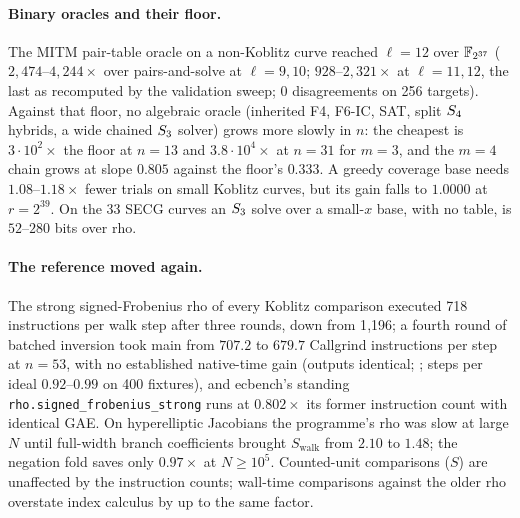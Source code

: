 \paragraph{Binary oracles and their floor.} The MITM pair-table oracle on a
non-Koblitz curve reached $\ell=12$ over $\mathbb{F}_{2^{37}}$
($2{,}474$--$4{,}244\times$ over pairs-and-solve at $\ell=9,10$;
$928$--$2{,}321\times$ at $\ell=11,12$, the last as recomputed by the
validation sweep; 0 disagreements on 256 targets).
Against that floor, no algebraic oracle (inherited F4, F6-IC, SAT, split
$S_{4}$ hybrids, a wide chained $S_{3}$ solver) grows more slowly in $n$:
the cheapest is $3\cdot10^2\times$ the floor at $n=13$ and $3.8\cdot10^4\times$
at $n=31$ for $m=3$, and the $m=4$ chain grows at slope $0.805$ against the
floor's $0.333$. A greedy coverage base needs $1.08$--$1.18\times$ fewer
trials on small Koblitz curves, but its gain falls to $1.0000$ at
$r=2^{39}$. On the 33 SECG curves an $S_{3}$ solve over a small-$x$ base,
with no table, is $52$--$280$ bits over rho.

\paragraph{The reference moved again.} The strong signed-Frobenius rho of
every Koblitz comparison executed 718 instructions per walk step after
three rounds, down from 1{,}196; a fourth round of batched inversion took
main from $707.2$ to $679.7$ Callgrind instructions per step at $n=53$, with
no established native-time gain (outputs identical;
; steps per ideal
$0.92$--$0.99$ on 400 fixtures), and ecbench's standing
\texttt{rho.signed\_frobenius\_strong} runs at $0.802\times$ its former
instruction count with identical GAE. On hyperelliptic Jacobians the
programme's rho was slow at large $N$ until full-width branch coefficients
brought $S_\text{walk}$ from $2.10$ to $1.48$; the negation fold saves only
$0.97\times$ at $N\ge10^5$. Counted-unit comparisons ($S$) are unaffected
by the instruction counts; wall-time comparisons against the older rho
overstate index calculus by up to the same factor.

